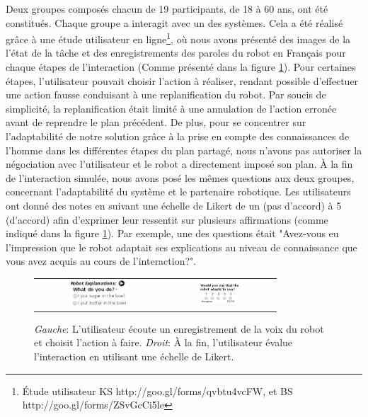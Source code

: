 \documentclass[a4paper,11pt,twoside]{StyleThese}
\begin{document}
Deux groupes composés chacun de 19 participants, de 18 à 60 ans, ont été constitués. Chaque groupe a interagit avec un des systèmes. Cela a été réalisé grâce à une étude utilisateur en ligne\footnote{Étude utilisateur KS http://goo.gl/forms/qvbtu4vcFW, et BS http://goo.gl/forms/ZSvGcCi5le}, où nous avons présenté des images de la l'état de la tâche et des enregistrements des paroles du robot en Français pour chaque étapes de l'interaction (Comme présenté dans la figure \ref{fig:user_study}).
Pour certaines étapes, l'utilisateur pouvait choisir l'action à réaliser, rendant possible d'effectuer une action fausse conduisant à une replanification du robot. Par soucis de simplicité, la replanification était limité à une annulation de l'action erronée avant de reprendre le plan précédent. De plus, pour se concentrer sur l'adaptabilité de notre solution grâce à la prise en compte des connaissances de l'homme dans les différentes étapes du plan partagé, nous n'avons pas autoriser la négociation avec l'utilisateur et le robot a directement imposé son plan.
À la fin de l'interaction simulée, nous avons posé les mêmes questions aux deux groupes, concernant l'adaptabilité du système et le partenaire robotique.
Les utilisateurs ont donné des notes en suivant une échelle de Likert de un (pas d'accord) à 5 (d'accord) afin d'exprimer leur ressentit sur plusieurs affirmations (comme indiqué dans la figure \ref{fig:user_study}).
Par exemple, une des questions était "Avez-vous eu l'impression que le robot adaptait ses explications au niveau de connaissance que vous avez acquis au cours de l'interaction?".

\begin{figure}[ht!]
 \centering
 \begin{tabular}{cc}
  \includegraphics[width=0.48\textwidth]{img/ustudy9.png} &
  \includegraphics[width=0.38\textwidth]{img/ustudy11.png}
 \end{tabular}
 \caption{\textit{Gauche}: L'utilisateur écoute un enregistrement de la voix du robot et choisit l'action à faire. \textit{Droit}: À la fin, l'utilisateur évalue l'interaction en utilisant une échelle de Likert.}
 \label{fig:user_study}
 \end{figure}
\end{document}
